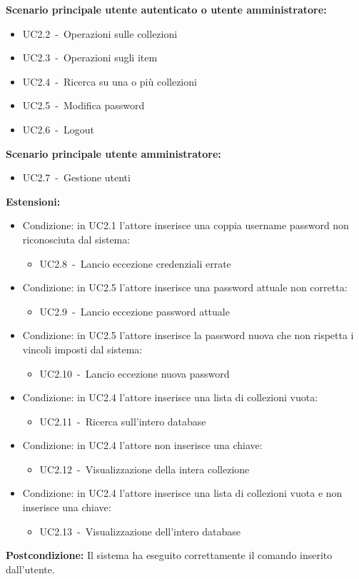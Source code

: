 \documentclass{scalatekids-article}
\begin{document}
\textbf{Scenario principale utente autenticato o utente amministratore:}
\begin{itemize}
\item UC2.2\ -\ Operazioni sulle collezioni
\item UC2.3\ -\ Operazioni sugli item
\item UC2.4\ -\ Ricerca su una o più collezioni
\item UC2.5\ -\ Modifica password
\item UC2.6\ -\ Logout
\end{itemize}
\textbf{Scenario principale utente amministratore:}
\begin{itemize}
\item UC2.7\ -\ Gestione utenti
\end{itemize}
\textbf{Estensioni:}
\begin{itemize}
\item Condizione: in UC2.1 l'attore inserisce una coppia username password non riconosciuta dal sistema:
  \begin{itemize}
  \item UC2.8\ -\ Lancio eccezione credenziali errate
  \end{itemize}
\item Condizione: in UC2.5 l'attore inserisce una password attuale non corretta:
  \begin{itemize}
  \item UC2.9\ -\ Lancio eccezione password attuale
  \end{itemize}
\item Condizione: in UC2.5 l'attore inserisce la password nuova che non rispetta i vincoli imposti dal sistema: %
  \begin{itemize}
  \item UC2.10\ -\ Lancio eccezione nuova password
  \end{itemize}
\item Condizione: in UC2.4 l'attore inserisce una lista di collezioni vuota:
  \begin{itemize}
  \item UC2.11\ -\ Ricerca sull'intero database
  \end{itemize}
\item Condizione: in UC2.4 l'attore non inserisce una chiave:
  \begin{itemize}
  \item UC2.12\ -\ Visualizzazione della intera collezione
  \end{itemize}
\item Condizione: in UC2.4 l'attore inserisce una lista di collezioni vuota e non inserisce una chiave:
  \begin{itemize}
  \item UC2.13\ -\ Visualizzazione dell'intero database
  \end{itemize}
\end{itemize}
\textbf{Postcondizione:} Il sistema ha eseguito correttamente il comando inserito dall'utente.
\end{document}
